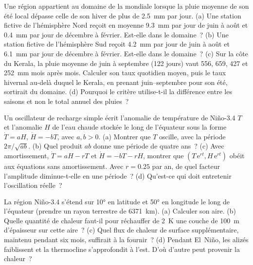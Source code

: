 \begin{exercise}[$\star\star$]\label{exo:b2:climate-variability:9}
Une région appartient au domaine de la  mondiale lorsque la pluie moyenne de son été local dépasse
celle de son hiver de plus de \qty{2.5}{mm} par jour. (a) Une station fictive de l'hémisphère Nord reçoit
en moyenne \qty{9.3}{mm} par jour de juin à août et \qty{0.4}{mm} par jour de décembre à février. Est-elle dans le domaine~?
(b) Une station fictive de l'hémisphère Sud reçoit \qty{4.2}{mm} par jour de juin à août et \qty{6.1}{mm} par jour
de décembre à février. Est-elle dans le domaine~?
(c) Sur la côte du Kerala, la pluie moyenne de juin à septembre
(122 jours) vaut 556, 659, 427 et \qty{252}{mm} mois après mois. Calculer son taux quotidien moyen, puis le taux hivernal
au-delà duquel le Kerala, en prenant juin--septembre pour son été, sortirait du domaine. (d) Pourquoi le critère utilise-t-il
la différence entre les saisons et non le total annuel des pluies~?
\end{exercise}

\begin{exercise}[$\star\star\star$]\label{exo:b2:climate-variability:10}
Un oscillateur de recharge simple écrit l'anomalie de température de Niño-3.4 $T$ et l'anomalie $H$ de l'eau chaude
stockée le long de l'équateur sous la forme $\dot T = aH$, $\dot H = -bT$, avec $a, b > 0$. (a) Montrer que $T$ oscille,
avec la période $2\pi/\sqrt{ab}$. (b) Quel produit $ab$ donne une période de quatre ans~?
(c) Avec amortissement, $\dot T = aH - rT$ et $\dot H = -bT - rH$, montrer que $(T\,\mathrm{e}^{rt}, H\,\mathrm{e}^{rt})$
obéit aux équations sans amortissement.
Avec $r = 0.25$ par an, de quel facteur l'amplitude diminue-t-elle en une période~?
(d) Qu'est-ce qui doit entretenir l'oscillation réelle~?
\end{exercise}

\begin{exercise}[$\star\star\star$]\label{exo:b2:climate-variability:11}
La région Niño-3.4 s'étend sur \ang{10} en latitude et \ang{50} en longitude le long de l'équateur
(prendre un rayon terrestre de \qty{6371}{km}). (a) Calculer son aire. (b) Quelle quantité de chaleur faut-il
pour réchauffer de \qty{2}{K} une couche de \qty{100}{m} d'épaisseur sur cette aire~? (c) Quel flux de chaleur de surface
supplémentaire, maintenu pendant six mois, suffirait à la fournir~? (d) Pendant El~Niño, les alizés faiblissent
et la thermocline s'approfondit à l'est. D'où d'autre peut provenir la chaleur~?
\end{exercise}

